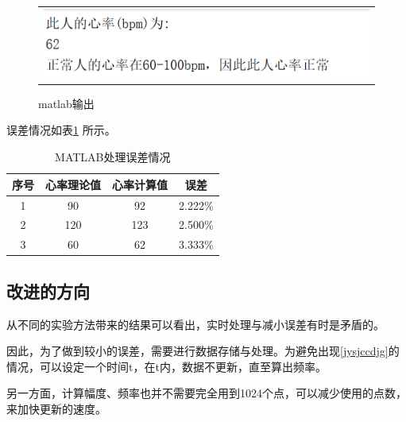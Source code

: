 \documentclass[12pt]{article}
\begin{document}
\begin{figure}[htbp]
  \centering
  \begin{tabular}{c}
  \includegraphics[width=.8\textwidth]{x3}
  \end{tabular}
  \caption{matlab输出}\label{matlabs33}
\end{figure}\par
误差情况如表\ref{tab:matlab}
所示。
\begin{table}[htbp]
  \centering
  \caption{MATLAB处理误差情况}
    \begin{tabular}{|c|c|c|c|}
    \hline
    序号 & 心率理论值 & 心率计算值 & 误差 \\
    \hline
    1 & 90 & 92 & 2.222\% \\
    \hline
    2 & 120 & 123 & 2.500\% \\
    \hline
    3 & 60 & 62 & 3.333\% \\
    \hline
    \end{tabular}%
  \label{tab:matlab}%
\end{table}%

\subsection{改进的方向}
从不同的实验方法带来的结果可以看出，实时处理与减小误差有时是矛盾的。\par
因此，为了做到较小的误差，需要进行数据存储与处理。为避免出现\ref{jysjccdjg}的情况，可以设定一个时间t，在t内，数据不更新，直至算出频率。\par
另一方面，计算幅度、频率也并不需要完全用到1024个点，可以减少使用的点数，来加快更新的速度。
\end{document}

